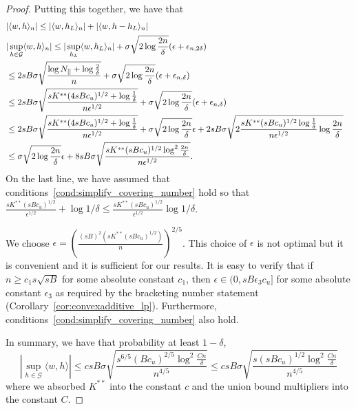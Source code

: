 \begin{proof}
Putting this together, we have that
\begin{align*}
\lefteqn{|\langle w, h \rangle_n | \leq | \langle w, h_L\rangle_n| + |\langle w, h - h_L\rangle_n|}\\
\lefteqn{|\sup_{h \in \mathcal{G}} \langle w, h \rangle_n| \leq 
     | \sup_{h_L} \langle w, h_L \rangle_n | + \sigma \sqrt{2 \log \frac{2n}{\delta}} (\epsilon + \epsilon_{n, 2\delta})} \\
   &\leq   2 sB \sigma \sqrt{ \frac{ \log N_{[]} + \log \frac{2}{\delta}}{n}} + \sigma \sqrt{2 \log \frac{2n}{\delta}} (\epsilon + \epsilon_{n, \delta}) \\
   &\leq  2 sB \sigma \sqrt{ \frac{sK^{**} (4sBc_u)^{1/2} + \log \frac{1}{\delta}}{n \epsilon^{1/2}}} +
   \sigma \sqrt{ 2\log \frac{2n}{\delta}} (\epsilon + \epsilon_{n, \delta}) \\
   &\leq 2 sB \sigma \sqrt{ \frac{sK^{**} (4sBc_u)^{1/2} + \log \frac{1}{\delta}}{n \epsilon^{1/2}}} +
   \sigma\sqrt{2 \log \frac{2n}{\delta}} \epsilon + 2sB \sigma \sqrt{2 \frac{sK^{**} (sBc_u)^{1/2}\log \frac{1}{\delta}}{n \epsilon^{1/2}} \log \frac{2n}{\delta}} \\
   &\leq \sigma\sqrt{2\log \frac{2n}{\delta}} \epsilon + 8 sB \sigma \sqrt{ \frac{sK^{**} (sBc_u)^{1/2} \log^2 \frac{2n}{\delta}}{n \epsilon^{1/2}}}.
\end{align*}
On the last line, we have assumed that conditions~\ref{cond:simplify_covering_number} hold so that $ \frac{sK^{**}(sBc_u)^{1/2}}{\epsilon^{1/2}} + \log 1/\delta \leq \frac{sK^{**} (sBc_u)^{1/2}}{\epsilon^{1/2}} \log 1/\delta$.

We choose $\epsilon = \left( \frac{(sB)^2 (s
    K^{**} (sBc_u)^{1/2})}{n} \right)^{2/5}$. This choice of $\epsilon$ is not optimal but it is convenient and it is sufficient for our results. It is easy to verify that
if $n \geq c_1 s \sqrt{sB}$ for some absolute constant $c_1$, then 
$\epsilon \in (0, sB \epsilon_3c_u]$ for some absolute constant $\epsilon_3$ as required by the bracketing number statement (Corollary~\ref{cor:convexadditive_lp}). Furthermore, conditions~\eqref{cond:simplify_covering_number} also hold. 


In summary, we have that probability at least $1-\delta$,
\[
|\sup_{h \in \mathcal{G}} \langle w, h \rangle | \leq c sB \sigma \sqrt{ 
   \frac{s^{6/5} (Bc_u)^{2/5} \log^2 \frac{Cn}{\delta}}{n^{4/5}}} \leq 
  c sB \sigma \sqrt{ 
   \frac{s (sBc_u)^{1/2} \log^2 \frac{Cn}{\delta}}{n^{4/5}}}
\]
where we absorbed $K^{**}$ into the constant $c$ and the union bound multipliers into the constant $C$.


\end{proof}
